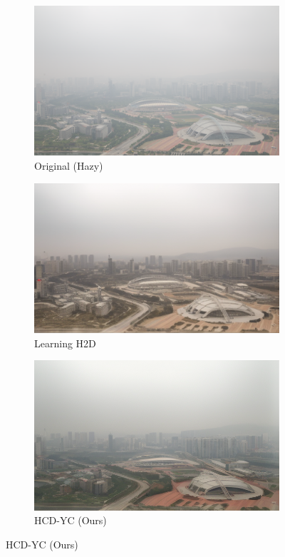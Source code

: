 \documentclass{article}
\begin{document}
\begin{figure}[t]
\begin{subfigure}[b]{0.32\textwidth}
    \centering
    \includegraphics[width=\textwidth]{examples_original/5.png}
    \caption{Original (Hazy)}
\end{subfigure}
\hfill
\begin{subfigure}[b]{0.32\textwidth}
    \centering
    \includegraphics[width=\textwidth]{examples_baseline/5.png}
    \caption{Learning H2D}
\end{subfigure}
\hfill
\begin{subfigure}[b]{0.32\textwidth}
    \centering
    \includegraphics[width=\textwidth]{examples_ours/5_isr_adaptive.png}
    \caption{HCD-YC (Ours)}
\end{subfigure}


\end{figure}
\end{document}
